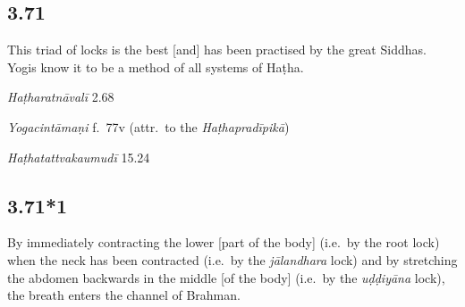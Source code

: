 \begin{ekdosis}
\subsection*{3.71}
\begin{translation}[hp03_071]
This triad of locks is the best [and] has been practised by the great Siddhas. Yogis know it to be a method of all systems of Haṭha.
\end{translation}


\begin{testimonia}[hp03_071]
\emph{Haṭharatnāvalī} 2.68
\begin{versinnote}
\end{versinnote}

\emph{Yogacintāmaṇi} f.~77v (attr.~to the \emph{Haṭhapradīpikā})
\begin{versinnote}
\end{versinnote}

\emph{Haṭhatattvakaumudī} 15.24
\begin{versinnote}
\end{versinnote}

\end{testimonia}



\subsection*{3.71*1}
\begin{translation}[hp03_071_1]
By immediately contracting the lower [part of the body] (i.e.~by the root lock) when the neck has been contracted (i.e.~by the \emph{jālandhara} lock) and by stretching the abdomen backwards in the middle [of the body] (i.e.~by the \emph{uḍḍiyāna} lock), the breath enters the channel of Brahman.
\end{translation}


\end{ekdosis}
